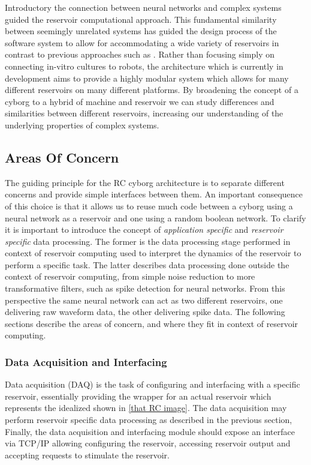 Introductory the connection between neural networks and complex systems guided
the reservoir computational approach.
This fundamental similarity between seemingly unrelated systems has guided the
design process of the software system to allow for accommodating a wide variety
of reservoirs in contrast to previous approaches such as
\cite{li_application_2015}.
Rather than focusing simply on connecting in-vitro cultures to robots, the
architecture which is currently in development aims to provide a highly modular
system which allows for many different reservoirs on many different platforms.
By broadening the concept of a cyborg to a hybrid of machine and reservoir we
can study differences and similarities between different reservoirs, increasing
our understanding of the underlying properties of complex systems.
\subsection{Areas Of Concern}
The guiding principle for the RC cyborg architecture is to separate different
concerns and provide simple interfaces between them.
An important consequence of this choice is that it allows us to reuse much code
between a cyborg using a neural network as a reservoir and one using a random
boolean network.
To clarify it is important to introduce the concept of \textit{application
  specific} and \textit{reservoir specific} data processing.
The former is the data processing stage performed in context of reservoir
computing used to interpret the dynamics of the reservoir to perform a specific
task.
The latter describes data processing done outside the context of reservoir
computing, from simple noise reduction to more transformative filters, such as
spike detection for neural networks.
From this perspective the same neural network can act as two different
reservoirs, one delivering raw waveform data, the other delivering spike data.
The following sections describe the areas of concern, and where they fit in
context of reservoir computing.
\subsubsection{Data Acquisition and Interfacing}
Data acquisition (DAQ) is the task of configuring and interfacing with a specific
reservoir, essentially providing the wrapper for an actual reservoir which
represents the idealized shown in \ref{that RC image}.
The data acquisition may perform reservoir specific data processing as described
in the previous section, 
Finally, the data acquisition and interfacing module should expose an interface
via TCP/IP allowing configuring the reservoir, accessing reservoir output and
accepting requests to stimulate the reservoir.
%
